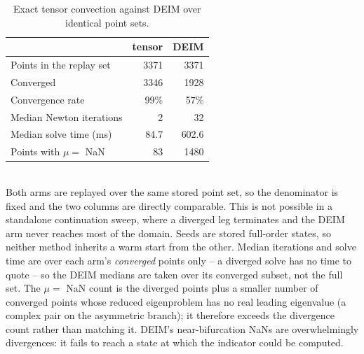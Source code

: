 \begin{table}[tb]
  \centering
  \caption{Exact tensor convection against DEIM over identical point sets.}
  \label{tab:hyperreduction}
  \begin{tabular}{lrr}
    \toprule
     & tensor & DEIM \\
    \midrule
    Points in the replay set & 3371 & 3371 \\
    Converged & 3346 & 1928 \\
    Convergence rate & 99\% & 57\% \\
    Median Newton iterations & 2 & 32 \\
    Median solve time (ms) & 84.7 & 602.6 \\
    Points with $\mu=$ NaN & 83 & 1480 \\
    \bottomrule
  \end{tabular}
  \\[2pt] \footnotesize Both arms are replayed over the same stored point set, so the denominator is fixed and the two columns are directly comparable. This is not possible in a standalone continuation sweep, where a diverged leg terminates and the DEIM arm never reaches most of the domain. Seeds are stored full-order states, so neither method inherits a warm start from the other. Median iterations and solve time are over each arm's \emph{converged} points only -- a diverged solve has no time to quote -- so the DEIM medians are taken over its converged subset, not the full set. The $\mu=$ NaN count is the diverged points plus a smaller number of converged points whose reduced eigenproblem has no real leading eigenvalue (a complex pair on the asymmetric branch); it therefore exceeds the divergence count rather than matching it. DEIM's near-bifurcation NaNs are overwhelmingly divergences: it fails to reach a state at which the indicator could be computed.
\end{table}
